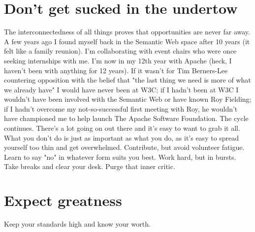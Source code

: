\section*{Don't get sucked in the undertow}
The interconnectedness of all things proves that opportunities are never far away. A few years ago I found myself back in the Semantic Web space after 10 years (it felt like a family reunion). I'm collaborating with event chairs who were once seeking internships with me. I'm now in my 12th year with Apache (heck, I haven't been with anything for 12 years). If it wasn't for Tim Berners-Lee countering opposition with the belief that "the last thing we need is more of what we already have" I would have never been at W3C; if I hadn't been at W3C I wouldn't have been involved with the Semantic Web or have known Roy Fielding; if I hadn't overcome my not-so-successful first meeting with Roy, he wouldn't have championed me to help launch The Apache Software Foundation. The cycle continues. There's a lot going on out there and it's easy to want to grab it all. What you don't do is just as important as what you do, as it's easy to spread yourself too thin and get overwhelmed. Contribute, but avoid volunteer fatigue. Learn to say "no" in whatever form suits you best. Work hard, but in bursts. Take breaks and clear your desk. Purge that inner critic.

\section*{Expect greatness}
Keep your standards high and know your worth.

